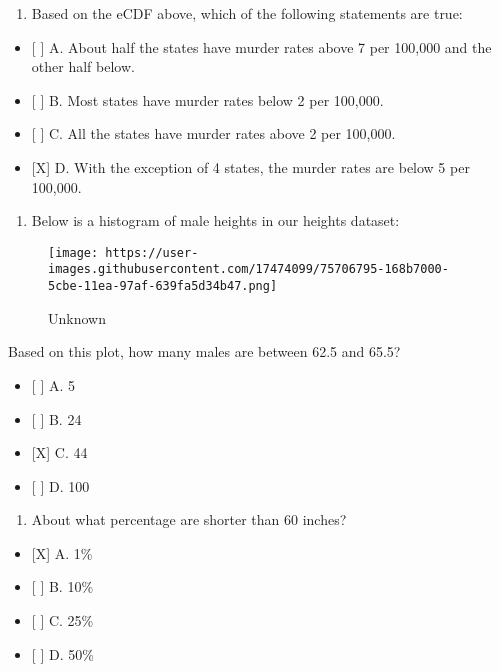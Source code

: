 \documentclass[]{article}
\providecommand{\tightlist}{%
  \setlength{\itemsep}{0pt}\setlength{\parskip}{0pt}}
\begin{document}
\begin{enumerate}
\def\labelenumi{\arabic{enumi}.}
\setcounter{enumi}{5}
\tightlist
\item
  Based on the eCDF above, which of the following statements are true:
\end{enumerate}

\begin{itemize}
\tightlist
\item
  {[} {]} A. About half the states have murder rates above 7 per 100,000
  and the other half below.
\item
  {[} {]} B. Most states have murder rates below 2 per 100,000.
\item
  {[} {]} C. All the states have murder rates above 2 per 100,000.
\item
  {[}X{]} D. With the exception of 4 states, the murder rates are below
  5 per 100,000.
\end{itemize}

\begin{enumerate}
\def\labelenumi{\arabic{enumi}.}
\setcounter{enumi}{6}
\tightlist
\item
  Below is a histogram of male heights in our heights dataset:
\end{enumerate}

\begin{figure}
\centering
\texttt{[image: https://user-images.githubusercontent.com/17474099/75706795-168b7000-5cbe-11ea-97af-639fa5d34b47.png]}
\caption{Unknown}
\end{figure}

Based on this plot, how many males are between 62.5 and 65.5?

\begin{itemize}
\tightlist
\item
  {[} {]} A. 5
\item
  {[} {]} B. 24
\item
  {[}X{]} C. 44
\item
  {[} {]} D. 100
\end{itemize}

\begin{enumerate}
\def\labelenumi{\arabic{enumi}.}
\setcounter{enumi}{7}
\tightlist
\item
  About what percentage are shorter than 60 inches?
\end{enumerate}

\begin{itemize}
\tightlist
\item
  {[}X{]} A. 1\%
\item
  {[} {]} B. 10\%
\item
  {[} {]} C. 25\%
\item
  {[} {]} D. 50\%
\end{itemize}
\end{document}
